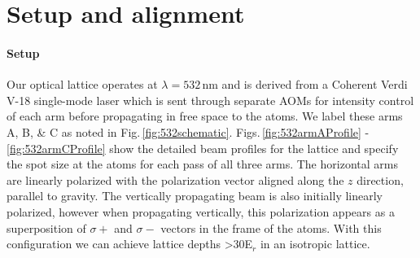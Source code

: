 \section{Setup and alignment} \label{sssec:532_align}
\paragraph{Setup}\label{ssec:lattice_setup}

Our optical lattice operates at $\lambda=532\,$nm and is derived from a Coherent Verdi V-18 single-mode laser which is sent through separate AOMs for intensity control of each arm before propagating in free space to the atoms. 
We label these arms A, B, \& C as noted in Fig.\,\ref{fig:532schematic}.
Figs.\,\ref{fig:532armAProfile} - \ref{fig:532armCProfile} show the detailed beam profiles for the lattice and specify the spot size at the atoms for each pass of all three arms.
The horizontal arms are linearly polarized with the polarization vector aligned along the $z$ direction, parallel to gravity. 
The vertically propagating beam is also initially linearly polarized, however when propagating vertically, this polarization appears as a superposition of $\sigma+$ and $\sigma-$ vectors in the frame of the atoms.
With this configuration we can achieve lattice depths >$30$E$_r$ in an isotropic lattice. 

